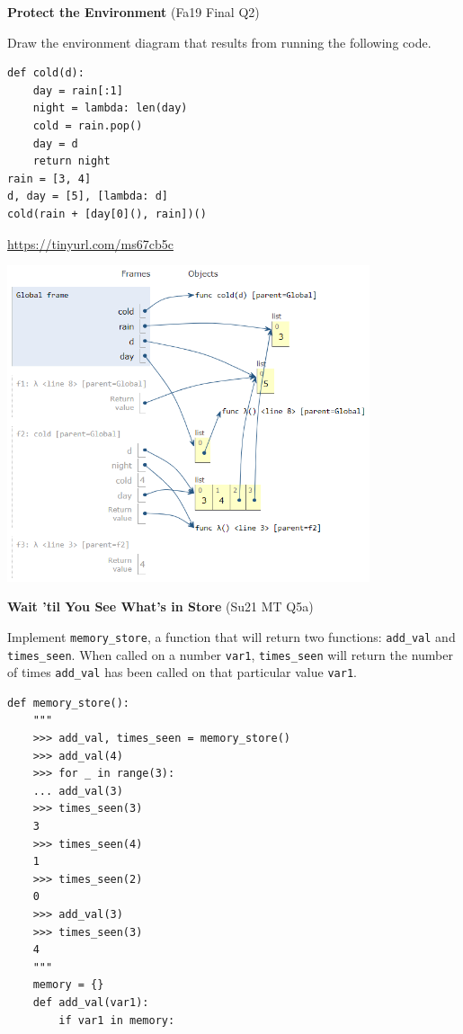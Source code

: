 \documentclass{exam}
\newlength{\currentparskip}
\newenvironment{blocksection}
{
    \setlength{\currentparskip}{\parskip}%
    \begin{minipage}{\linewidth}
    \setlength{\parskip}{\currentparskip}%
}
{
    \end{minipage}
}
\begin{document}
\begin{questions}
\begin{blocksection}
\question \textbf{Protect the Environment} (Fa19 Final Q2)

Draw the environment diagram that results from running the following code.
\begin{lstlisting}
def cold(d):
    day = rain[:1]
    night = lambda: len(day)
    cold = rain.pop()
    day = d
    return night
rain = [3, 4]
d, day = [5], [lambda: d]
cold(rain + [day[0](), rain])()
\end{lstlisting}
\begin{solution}[5in]
    \url{https://tinyurl.com/ms67cb5c}
    
    \includegraphics[width=0.8\textwidth]{protecttheenvironment.png}
\end{solution}
\end{blocksection}

\begin{blocksection}
\question \textbf{Wait 'til You See What's in Store} (Su21 MT Q5a)

Implement \lstinline{memory_store}, a function that will return two functions: \lstinline{add_val} and \lstinline{times_seen}. When called on a number \lstinline{var1}, \lstinline{times_seen} will return the number of times \lstinline{add_val} has been called on that particular value \lstinline{var1}.

\begin{lstlisting}
def memory_store():
    """
    >>> add_val, times_seen = memory_store()
    >>> add_val(4)
    >>> for _ in range(3):
    ... add_val(3)
    >>> times_seen(3)
    3
    >>> times_seen(4)
    1
    >>> times_seen(2)
    0
    >>> add_val(3)
    >>> times_seen(3)
    4
    """
    memory = {}
    def add_val(var1):
        if var1 in memory:


\end{lstlisting}
\end{blocksection}
\end{questions}
\end{document}

